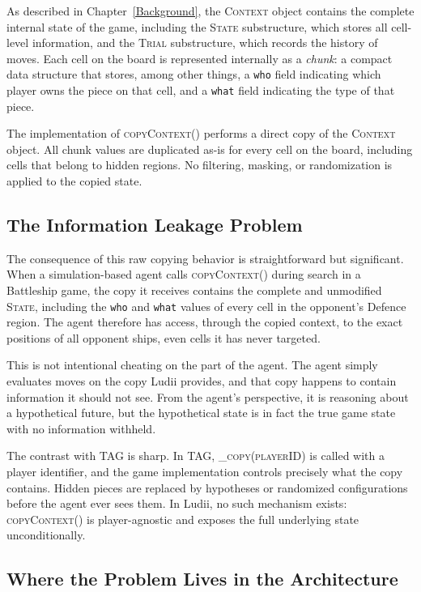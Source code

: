 As described in Chapter~\ref{Background}, the \textsc{Context} object contains the complete internal state of the game, including the \textsc{State} substructure, which stores all cell-level information, and the \textsc{Trial} substructure, which records the history of moves. Each cell on the board is represented internally as a \textit{chunk}: a compact data structure that stores, among other things, a \texttt{who} field indicating which player owns the piece on that cell, and a \texttt{what} field indicating the type of that piece.

The implementation of \textsc{copyContext()} performs a direct copy of the \textsc{Context} object. All chunk values are duplicated as-is for every cell on the board, including cells that belong to hidden regions. No filtering, masking, or randomization is applied to the copied state.

\subsection{The Information Leakage Problem}

The consequence of this raw copying behavior is straightforward but significant. When a simulation-based agent calls \textsc{copyContext()} during search in a Battleship game, the copy it receives contains the complete and unmodified \textsc{State}, including the \texttt{who} and \texttt{what} values of every cell in the opponent's Defence region. The agent therefore has access, through the copied context, to the exact positions of all opponent ships, even cells it has never targeted.

This is not intentional cheating on the part of the agent. The agent simply evaluates moves on the copy Ludii provides, and that copy happens to contain information it should not see. From the agent's perspective, it is reasoning about a hypothetical future, but the hypothetical state is in fact the true game state with no information withheld.

The contrast with TAG is sharp. In TAG, \textsc{\_copy(playerID)} is called with a player identifier, and the game implementation controls precisely what the copy contains. Hidden pieces are replaced by hypotheses or randomized configurations before the agent ever sees them. In Ludii, no such mechanism exists: \textsc{copyContext()} is player-agnostic and exposes the full underlying state unconditionally.

\subsection{Where the Problem Lives in the Architecture}

